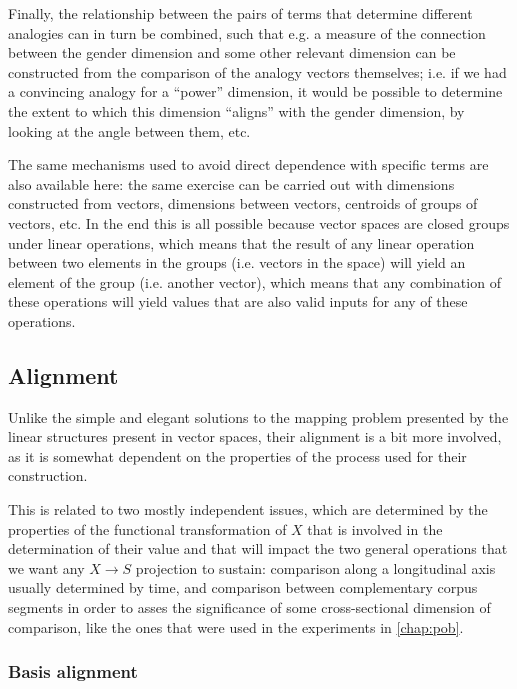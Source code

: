 Finally, the relationship between the pairs of terms that determine different analogies can in turn be combined, such that e.g. a measure of the connection between the gender dimension and some other relevant dimension can be constructed from the comparison of the analogy vectors themselves; i.e. if we had a convincing analogy for a ``power'' dimension, it would be possible to determine the extent to which this dimension ``aligns'' with the gender dimension, by looking at the angle between them, etc.

The same mechanisms used to avoid direct dependence with specific terms are also available here: the same exercise can be carried out with dimensions constructed from vectors, dimensions between vectors, centroids of groups of vectors, etc.
In the end this is all possible because vector spaces are closed groups under linear operations, which means that the result of any linear operation between two elements in the groups (i.e. vectors in the space) will yield an element of the group (i.e. another vector), which means that any combination of these operations will yield values that are also valid inputs for any of these operations.

\subsection{Alignment}

Unlike the simple and elegant solutions to the mapping problem presented by the linear structures present in vector spaces, their alignment is a bit more involved, as it is somewhat dependent on the properties of the process used for their construction.

This is related to two mostly independent issues, which are determined by the properties of the functional transformation of $X$ that is involved in the determination of their value and that will impact the two general operations that we want any $X \rightarrow S$ projection to sustain: comparison along a longitudinal axis usually determined by time, and comparison between complementary corpus segments in order to asses the significance of some cross-sectional dimension of comparison, like the ones that were used in the experiments in \autoref{chap:pob}.

\subsubsection{Basis alignment}

